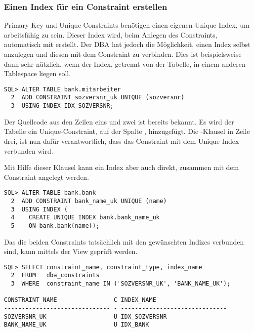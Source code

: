         \subsubsection{Einen Index f\"ur ein Constraint erstellen}
          Primary Key und Unique Constraints ben\"otigen einen eigenen Unique Index, um arbeitsf\"ahig zu sein. Dieser Index wird, beim Anlegen des Constraints, automatisch mit erstellt. Der DBA hat jedoch die M\"oglichkeit, einen Index selbst anzulegen und diesen mit dem Constraint zu verbinden. Dies ist beispielsweise dann sehr n\"utzlich, wenn der Index, getrennt von der Tabelle, in einem anderen Tablespace liegen soll.
          \begin{lstlisting}[caption={Ein Unique Constraint mit einem Index verbinden},label=admin316,language=oracle_sql]
SQL> ALTER TABLE bank.mitarbeiter
  2  ADD CONSTRAINT sozversnr_uk UNIQUE (sozversnr)
  3  USING INDEX IDX_SOZVERSNR;
          \end{lstlisting}
          Der Quellcode aus den Zeilen eins und zwei ist bereits bekannt. Es wird der Tabelle  ein Unique-Constraint, auf der Spalte , hinzugef\"ugt. Die -Klausel in Zeile drei, ist nun daf\"ur verantwortlich, dass das Constraint  mit dem Unique Index  verbunden wird.

          Mit Hilfe dieser Klausel kann ein Index aber auch direkt, zusammen mit dem Constraint angelegt werden.
\clearpage
          \begin{lstlisting}[caption={Ein Unique Constraint zusammen mit einem Index erstellen},label=admin317,language=oracle_sql]
SQL> ALTER TABLE bank.bank
  2  ADD CONSTRAINT bank_name_uk UNIQUE (name)
  3  USING INDEX (
  4    CREATE UNIQUE INDEX bank.bank_name_uk
  5    ON bank.bank(name));
          \end{lstlisting}
          Das die beiden Constraints tats\"achlich mit den gew\"unschten Indizes verbunden sind, kann mittels der View  gepr\"uft werden.
          \begin{lstlisting}[caption={Die View \identifier{dba\_constraints}},label=admin318,language=oracle_sql]
SQL> SELECT constraint_name, constraint_type, index_name
  2  FROM   dba_constraints
  3  WHERE  constraint_name IN ('SOZVERSNR_UK', 'BANK_NAME_UK');

CONSTRAINT_NAME                C INDEX_NAME
------------------------------ - ------------------------------
SOZVERSNR_UK                   U IDX_SOZVERSNR
BANK_NAME_UK                   U IDX_BANK
          \end{lstlisting}
